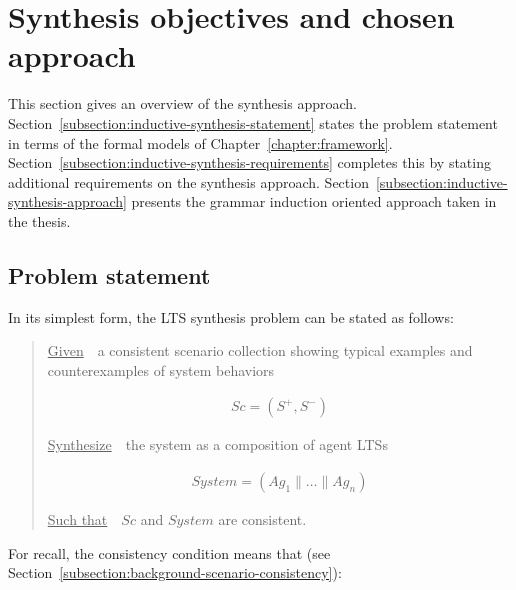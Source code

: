 \section{Synthesis objectives and chosen approach\label{section:inductive-overview}}

This section gives an overview of the synthesis approach. Section~\ref{subsection:inductive-synthesis-statement} states the problem statement in terms of the formal models of Chapter~\ref{chapter:framework}. Section~\ref{subsection:inductive-synthesis-requirements} completes this by stating additional requirements on the synthesis approach. Section~\ref{subsection:inductive-synthesis-approach} presents the grammar induction oriented approach taken in the thesis.


\subsection{Problem statement\label{subsection:inductive-synthesis-statement}}

In its simplest form, the LTS synthesis problem can be stated as follows:

\begin{quotation}
\noindent \underline{Given}~~a consistent scenario collection showing typical examples and counterexamples of system behaviors

\vspace{-0.7cm}
\begin{align*}
Sc = (S^+,S^-)
\end{align*}

\vspace{-0.2cm}
\noindent \underline{Synthesize}~~the system as a composition of agent LTSs

\vspace{-0.7cm}
\begin{align*}
System = (Ag_1 \parallel \ldots \parallel Ag_n)
\end{align*}

\vspace{-0.2cm}
\noindent \underline{Such that}~~$Sc$ and $System$ are consistent.
\end{quotation}

\noindent For recall, the consistency condition means that (see Section~\ref{subsection:background-scenario-consistency}):

